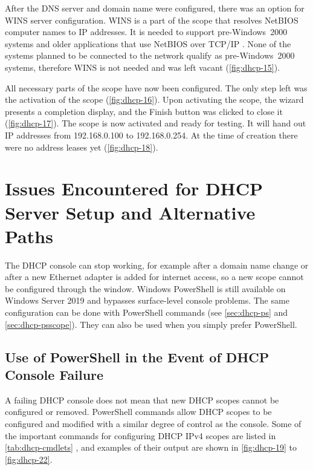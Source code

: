 
After the DNS server and domain name were configured, there was an option for WINS server configuration. WINS is a part of the scope that resolves NetBIOS computer names to IP addresses. It is needed to support pre-Windows~2000 systems and older applications that use NetBIOS over TCP/IP \cite{msft-wins}. None of the systems planned to be connected to the network qualify as pre-Windows~2000 systems, therefore WINS is not needed and was left vacant (\autoref{fig:dhcp-15}).


All necessary parts of the scope have now been configured. The only step left was the activation of the scope (\autoref{fig:dhcp-16}). Upon activating the scope, the wizard presents a completion display, and the Finish button was clicked to close it (\autoref{fig:dhcp-17}). The scope is now activated and ready for testing. It will hand out IP addresses from 192.168.0.100 to 192.168.0.254. At the time of creation there were no address leases yet (\autoref{fig:dhcp-18}).


\section{Issues Encountered for DHCP Server Setup and Alternative Paths}
\label{sec:dhcp-issues}

{The DHCP console can stop working, for example after a domain name change or after a new Ethernet adapter is added for internet access, so a new scope cannot be configured through the window.}
{Windows PowerShell is still available on Windows Server 2019 and bypasses surface-level console problems. The same configuration can be done with PowerShell commands (see \autoref{sec:dhcp-ps} and \autoref{sec:dhcp-psscope}). They can also be used when you simply prefer PowerShell.}

\subsection{Use of PowerShell in the Event of DHCP Console Failure}
\label{sec:dhcp-ps}
A failing DHCP console does not mean that new DHCP scopes cannot be configured or removed. PowerShell commands allow DHCP scopes to be configured and modified with a similar degree of control as the console. Some of the important commands for configuring DHCP IPv4 scopes are listed in \autoref{tab:dhcp-cmdlets} \cite{msft-dhcpserver-module}, and examples of their output are shown in \autoref{fig:dhcp-19} to \autoref{fig:dhcp-22}.

